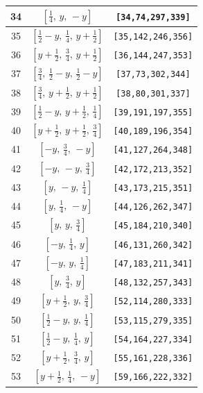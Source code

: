 \documentclass[fleqn,8pt]{jsarticle}
\begin{document}
\begin{longtable}{ccc}
34 & $\left[ \frac{1}{4},\, y,\, - y \right]$ & {\tt [34,74,297,339]} \\ \hline
35 & $\left[ \frac{1}{2} - y,\, \frac{1}{4},\, y + \frac{1}{2} \right]$ & {\tt [35,142,246,356]} \\ \hline
36 & $\left[ y + \frac{1}{2},\, \frac{3}{4},\, y + \frac{1}{2} \right]$ & {\tt [36,144,247,353]} \\ \hline
37 & $\left[ \frac{3}{4},\, \frac{1}{2} - y,\, \frac{1}{2} - y \right]$ & {\tt [37,73,302,344]} \\ \hline
38 & $\left[ \frac{3}{4},\, y + \frac{1}{2},\, y + \frac{1}{2} \right]$ & {\tt [38,80,301,337]} \\ \hline
39 & $\left[ \frac{1}{2} - y,\, y + \frac{1}{2},\, \frac{1}{4} \right]$ & {\tt [39,191,197,355]} \\ \hline
40 & $\left[ y + \frac{1}{2},\, y + \frac{1}{2},\, \frac{3}{4} \right]$ & {\tt [40,189,196,354]} \\ \hline
41 & $\left[ - y,\, \frac{3}{4},\, - y \right]$ & {\tt [41,127,264,348]} \\ \hline
42 & $\left[ - y,\, - y,\, \frac{3}{4} \right]$ & {\tt [42,172,213,352]} \\ \hline
43 & $\left[ y,\, - y,\, \frac{1}{4} \right]$ & {\tt [43,173,215,351]} \\ \hline
44 & $\left[ y,\, \frac{1}{4},\, - y \right]$ & {\tt [44,126,262,347]} \\ \hline
45 & $\left[ y,\, y,\, \frac{3}{4} \right]$ & {\tt [45,184,210,340]} \\ \hline
46 & $\left[ - y,\, \frac{1}{4},\, y \right]$ & {\tt [46,131,260,342]} \\ \hline
47 & $\left[ - y,\, y,\, \frac{1}{4} \right]$ & {\tt [47,183,211,341]} \\ \hline
48 & $\left[ y,\, \frac{3}{4},\, y \right]$ & {\tt [48,132,257,343]} \\ \hline
49 & $\left[ y + \frac{1}{2},\, y,\, \frac{3}{4} \right]$ & {\tt [52,114,280,333]} \\ \hline
50 & $\left[ \frac{1}{2} - y,\, y,\, \frac{1}{4} \right]$ & {\tt [53,115,279,335]} \\ \hline
51 & $\left[ \frac{1}{2} - y,\, \frac{1}{4},\, y \right]$ & {\tt [54,164,227,334]} \\ \hline
52 & $\left[ y + \frac{1}{2},\, \frac{3}{4},\, y \right]$ & {\tt [55,161,228,336]} \\ \hline
53 & $\left[ y + \frac{1}{2},\, \frac{1}{4},\, - y \right]$ & {\tt [59,166,222,332]} \\ \hline

\end{longtable}
\end{document}
